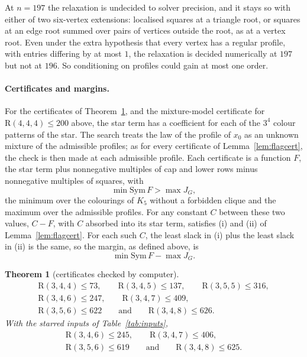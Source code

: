\documentclass[11pt]{article}
\theoremstyle{spacedplain}
\newtheorem{theorem}{Theorem}[section]
\theoremstyle{spaceddef}
\theoremstyle{spacedremark}
\newcommand{\R}{\mathrm{R}}
\begin{document}
At $n=197$ the relaxation is undecided to solver precision, and it stays so with either of two six-vertex extensions: localised squares at a triangle root, or squares at an edge root summed over pairs of vertices outside the root, as at a vertex root.
Even under the extra hypothesis that every vertex has a regular profile, with entries differing by at most $1$, the relaxation is decided numerically at $197$ but not at $196$.
So conditioning on profiles could gain at most one order.

\paragraph{Certificates and margins.}
For the certificates of Theorem~\ref{thm:r34five}, and the mixture-model certificate for $\R(4,4,4)\le 200$ above, the star term has a coefficient for each of the $3^4$ colour patterns of the star.
The search treats the law of the profile of $x_0$ as an unknown mixture of the admissible profiles; as for every certificate of Lemma~\ref{lem:flagcert}, the check is then made at each admissible profile.
Each certificate is a function $F$, the star term plus nonnegative multiples of cap and lower rows minus nonnegative multiples of squares, with
\[
\min\mathrm{Sym}\,F>\max J_G,
\]
the minimum over the colourings of $K_5$ without a forbidden clique and the maximum over the admissible profiles.
For any constant $C$ between these two values, $C-F$, with $C$ absorbed into its star term, satisfies (i) and (ii) of Lemma~\ref{lem:flagcert}.
For each such $C$, the least slack in (i) plus the least slack in (ii) is the same, so the margin, as defined above, is
\[
\min\mathrm{Sym}\,F-\max J_G.
\]

\begin{theorem}[certificates checked by computer]\label{thm:r34five}
\begin{gather*}
\R(3,4,4)\le 73,\qquad \R(3,4,5)\le 137,\qquad \R(3,5,5)\le 316,\\
\R(3,4,6)\le 247,\qquad \R(3,4,7)\le 409,\\
\R(3,5,6)\le 622\qquad\text{and}\qquad \R(3,4,8)\le 626.
\end{gather*}
With the starred inputs of Table~\ref{tab:inputs},
\begin{gather*}
\R(3,4,6)\le 245,\qquad \R(3,4,7)\le 406,\\
\R(3,5,6)\le 619\qquad\text{and}\qquad \R(3,4,8)\le 625.
\end{gather*}
\end{theorem}
\end{document}
